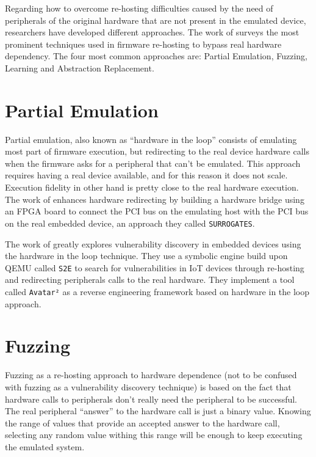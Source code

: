 Regarding how to overcome re-hosting difficulties caused by the need of peripherals of the original hardware that are not present in the emulated device, researchers have developed different approaches. The work of \cite{firmware-challenges} surveys the most prominent techniques used in firmware re-hosting to bypass real hardware dependency. The four most common approaches are: Partial Emulation, Fuzzing, Learning and Abstraction Replacement.

\section{Partial Emulation}

Partial emulation, also known as ``hardware in the loop'' consists of emulating most part of firmware execution, but redirecting to the real device hardware calls when the firmware asks for a peripheral that can't be emulated. This approach requires having a real device available, and for this reason it does not scale. Execution fidelity in other hand is pretty close to the real hardware execution. The work of \cite{surrogates} enhances hardware redirecting by building a hardware bridge using an FPGA board to connect the PCI bus on the emulating host with the PCI bus on the real embedded device, an approach they called {\tt SURROGATES}.

The work of \cite{avatar2} greatly explores vulnerability discovery in embedded devices using the hardware in the loop technique. They use a symbolic engine build upon QEMU called {\tt S2E} to search for vulnerabilities in IoT devices through re-hosting and redirecting peripherals calls to the real hardware. They implement a tool called {\tt Avatar²} as a reverse engineering framework based on hardware in the loop approach.

\section{Fuzzing}

Fuzzing as a re-hosting approach to hardware dependence (not to be confused with fuzzing as a vulnerability discovery technique) is based on the fact that hardware calls to peripherals don't really need the peripheral to be successful. The real peripheral ``answer'' to the hardware call is just a binary value. Knowing the range of values that provide an accepted answer to the hardware call, selecting any random value withing this range will be enough to keep executing the emulated system.


